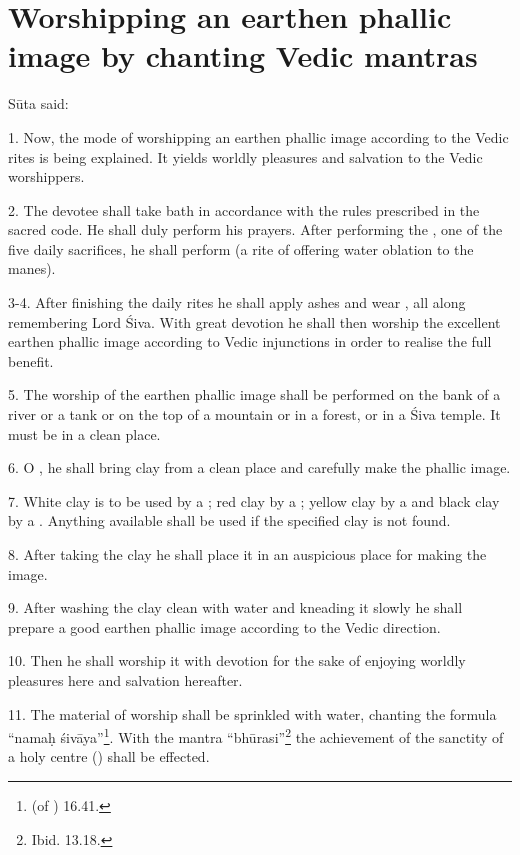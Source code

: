 \chapter{Worshipping an earthen phallic image by chanting Vedic mantras}

Sūta said:

1. Now, the mode of worshipping an earthen phallic image according to the Vedic
rites is being explained. It yields worldly pleasures and salvation to the Vedic
worshippers.

2. The devotee shall take bath in accordance with the rules prescribed in
the sacred code. He shall duly perform his  prayers. After
performing the , one of the five daily sacrifices, he shall
perform  (a rite of offering water oblation to the manes).

3-4. After finishing the daily rites he shall apply ashes and wear ,
all along remembering Lord Śiva. With great devotion he shall then worship
the excellent earthen phallic image according to Vedic injunctions in order to
realise the full benefit.

5. The worship of the earthen phallic image shall be performed on the bank of
a river or a tank or on the top of a mountain or in a forest, or in a Śiva
temple. It must be in a clean place.

6. O , he shall bring clay from a clean place and carefully make
the phallic image.

7. White clay is to be used by a ; red clay by a ;
yellow clay by a  and black clay by a . Anything available
shall be used if the specified clay is not found.

8. After taking the clay he shall place it in an auspicious place for making
the image.

9. After washing the clay clean with water and kneading it slowly he shall
prepare a good earthen phallic image according to the Vedic direction.

10. Then he shall worship it with devotion for the sake of enjoying worldly
pleasures here and salvation hereafter.

11. The material of worship shall be sprinkled with water, chanting the formula
“namaḥ śivāya”\footnote{ (of ) 16.41.}.
With the mantra “bhūrasi”\footnote{Ibid. 13.18.} \etc the achievement of
the sanctity of a holy centre () shall be effected.

